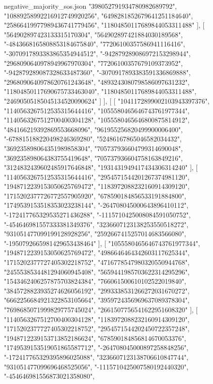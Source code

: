 \begin{filecontents*}[overwrite]{negative_majority_sos.json}
    "398052791934780982689792",
    "10889258992216912749920256",
    "6498281852679641251184640",
    "25866419977989436741779456",
    "11804850117689844053311488"
   ],
   [
    "564902897423133315170304",
    "564902897421884030189568",
    "-4843668165808853184675840",
    "77206100357586941116416",
    "-3070917893383865354944512",
    "-942879289086972153298944",
    "2968090640978949967970304",
    "77206100357679109373952",
    "-942879289087328633487360",
    "-3070917893383591336869888",
    "2968090640978620761243648",
    "4893243080798586097631232",
    "11804850117690675733463040",
    "11804850117689844053311488",
    "24690505185045134520090624"
   ]
  ],
  [
   [
    "1041172899002103943397376",
    "1140563267512535315644416",
    "1055580465646743761977344",
    "1140563267512700400304128",
    "1055580465646800875814912",
    "484166219392869553668096",
    "961955256820499900006400",
    "-678815188220498246369280",
    "52486167865046582034432",
    "369235898064351989858304",
    "705737936604799314690048",
    "369235898064383755419648",
    "705737936604758163849216",
    "3124832439602485917646848",
    "1931431949417434306314240"
   ],
   [
    "1140563267512535315644416",
    "2954571544201267374981120",
    "1948712239153050625769472",
    "1183972088232160914309120",
    "1715202377726772557905920",
    "678590184856533191884800",
    "1749539153518353023238144",
    "-264708045000643896410112",
    "-172417765329535271436288",
    "-1115710425008084591050752",
    "-454646981557333381349376",
    "3236607123138253550518272",
    "931051477099199128928256",
    "2592667415257014683566080",
    "-1950792665981429653438464"
   ],
   [
    "1055580465646743761977344",
    "1948712239153050625769472",
    "4986646464342603117625344",
    "1715202377727405302218752",
    "4716778547980320550944768",
    "2455538534481294060945408",
    "5659441985703622314295296",
    "1543462406257875703824384",
    "766061500610102522019840",
    "3845728823935274626056192",
    "2993338531266272031670272",
    "6662256684921322853105664",
    "3959724356969637089378304",
    "7698685071999829775745024",
    "2661507756541622951608320"
   ],
   [
    "1140563267512700400304128",
    "1183972088232160914309120",
    "1715202377727405302218752",
    "2954571544202450722357248",
    "1948712239153713852186624",
    "678590184856814670053376",
    "1749539153519051865587712",
    "-264708045000897258848256",
    "-172417765329395896025088",
    "3236607123138706610847744",
    "931051477099696468525056",
    "-1115710425007580192440320",
    "-454646981556873021358080",

\end{filecontents*}
